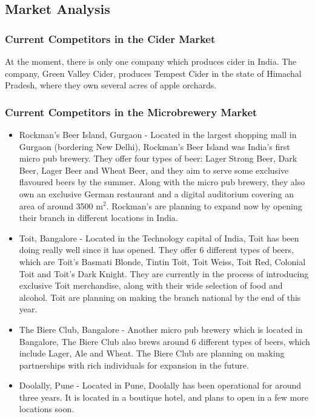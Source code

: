 \documentclass[11pt]{article}
\begin{document}
\subsection{Market Analysis}
  \subsubsection{Current Competitors in the Cider Market}
At the moment, there is only one company which produces cider in India. The company, Green Valley Cider, produces Tempest Cider in the state of Himachal Pradesh, where they own several acres of apple orchards.

  \subsubsection{Current Competitors in the Microbrewery Market}
  \begin{itemize}
  \item Rockman's Beer Island, Gurgaon - Located in the largest shopping mall in Gurgaon (bordering New Delhi), Rockman's Beer Island was India's first micro pub brewery. They offer four types of beer: Lager Strong Beer, Dark Beer, Lager Beer and Wheat Beer, and they aim to serve some exclusive flavoured beers by the summer. Along with the micro pub brewery, they also own an exclusive German restaurant and a digital auditorium covering an area of around 3500 m$^2$. Rockman's are planning to expand now by opening their branch in different locations in India.
  \item Toit, Bangalore - Located in the Technology capital of India, Toit has been doing really well since it has opened. They offer 6 different types of beers, which are Toit's Basmati Blonde, Tintin Toit, Toit Weiss, Toit Red, Colonial Toit and Toit's Dark Knight. They are currently in the process of introducing exclusive Toit merchandise, along with their wide selection of food and alcohol. Toit are planning on making the branch national by the end of this year.
  \item The Biere Club, Bangalore - Another micro pub brewery which is located in Bangalore, The Biere Club also brews around 6 different types of beers, which include Lager, Ale and Wheat. The Biere Club are planning on making partnerships with rich individuals for expansion in the future.
  \item Doolally, Pune - Located in Pune, Doolally has been operational for around three years. It is located in a boutique hotel, and plans to open in a few more locations soon.
  \end{itemize}
\end{document}
